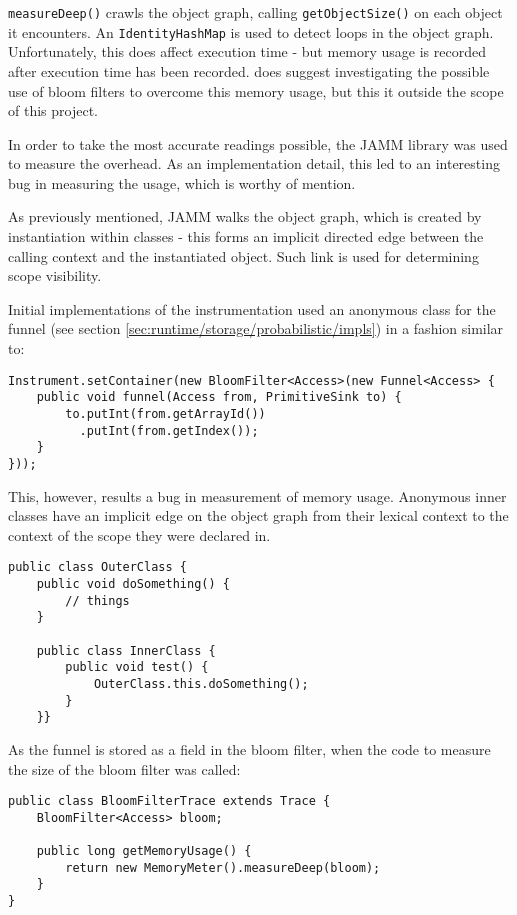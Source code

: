 	\texttt{measureDeep()} crawls the object graph, calling \texttt{getObjectSize()} on each object it encounters. An \texttt{IdentityHashMap} is used to detect loops in the object graph. Unfortunately, this does affect execution time - but memory usage is recorded after execution time has been recorded. \citeauthor{JAMM} does suggest investigating the possible use of bloom filters to overcome this memory usage, but this it outside the scope of this project.
	
	In order to take the most accurate readings possible, the JAMM library was used to measure the overhead. As an implementation detail, this led to an interesting bug in measuring the usage, which is worthy of mention.
	
	As previously mentioned, JAMM walks the object graph, which is created by instantiation within classes - this forms an implicit directed edge between the calling context and the instantiated object. Such link is used for determining scope visibility.
	
	Initial implementations of the instrumentation used an anonymous class for the funnel (see section \ref{sec:runtime/storage/probabilistic/impls}) in a fashion similar to:
	
	\begin{lstlisting}
Instrument.setContainer(new BloomFilter<Access>(new Funnel<Access> {
    public void funnel(Access from, PrimitiveSink to) {
        to.putInt(from.getArrayId())
          .putInt(from.getIndex());
    }
}));\end{lstlisting}
	
	This, however, results a bug in measurement of memory usage. Anonymous inner classes have an implicit edge on the object graph from their lexical context to the context of the scope they were declared in.
	
	\begin{lstlisting}
public class OuterClass {
    public void doSomething() {
        // things
    }
	
    public class InnerClass {
        public void test() {
            OuterClass.this.doSomething();
        }
    }}\end{lstlisting}
	
	As the funnel is stored as a field in the bloom filter, when the code to measure the size of the bloom filter was called:
	
	\begin{lstlisting}
public class BloomFilterTrace extends Trace {
    BloomFilter<Access> bloom;
    
    public long getMemoryUsage() {
        return new MemoryMeter().measureDeep(bloom);
    }
}\end{lstlisting}

